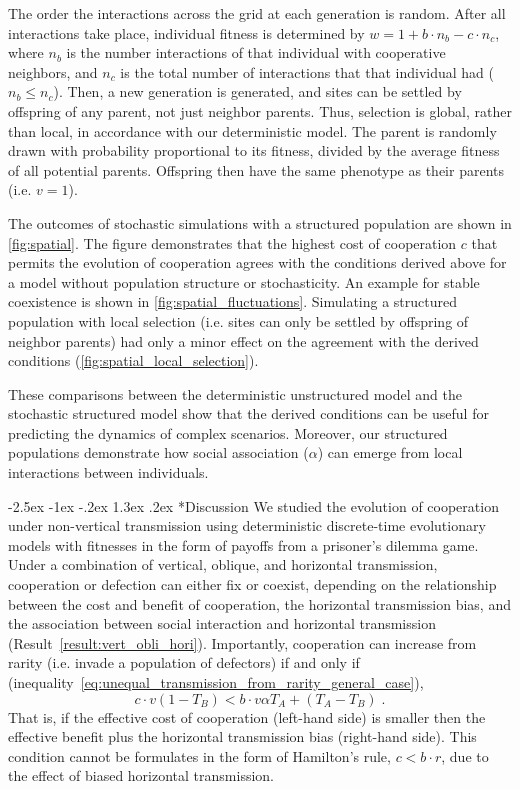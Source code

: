 \documentclass[12pt]{extarticle}
\makeatletter
\renewcommand\section{\@startsection {section}{1}{\z@}%
     {-2.5ex \@plus -1ex \@minus -.2ex}%
     {1.3ex \@plus.2ex}%
    {\Large\bfseries}}
\makeatother
\begin{document}
The order the interactions across the grid at each generation is random.
After all interactions take place, individual fitness is determined by
$w = 1 + b \cdot n_b - c \cdot n_c$,
where $n_b$ is the number interactions of that individual with cooperative neighbors, and $n_c$ is the total number of interactions that that individual  had ($n_b \le n_c$).
Then, a new generation is generated, and sites can be settled by offspring of any parent, not just neighbor parents. Thus, selection is global, rather than local, in accordance with our deterministic model.
The parent is randomly drawn with probability proportional to its fitness, divided by the average fitness of all potential parents.
Offspring then have the same phenotype as their parents (i.e. $v=1$).

The outcomes of stochastic simulations with a structured population are shown in \autoref{fig:spatial}. The figure demonstrates that the highest cost of cooperation $c$ that permits the evolution of cooperation agrees with the conditions derived above for a model without population structure or stochasticity.
An example for stable coexistence is shown in \autoref{fig:spatial_fluctuations}.
Simulating a structured population with local selection (i.e. sites can only be settled by offspring of neighbor parents) had only a minor effect on the agreement with the derived conditions (\autoref{fig:spatial_local_selection}).

These comparisons between the deterministic unstructured model and the stochastic structured model show that the derived conditions can be useful for predicting the dynamics of complex scenarios. 
Moreover, our structured populations demonstrate how social association ($\alpha$) can emerge from local interactions between individuals.


\section*{Discussion}
We studied the evolution of cooperation under non-vertical transmission using deterministic discrete-time evolutionary models with fitnesses in the form of payoffs from a prisoner's dilemma game. 
Under a combination of vertical, oblique, and horizontal transmission, cooperation or defection can either fix or coexist, depending on the relationship between the cost and benefit of cooperation, the horizontal transmission bias, and the association between social interaction and horizontal transmission (Result~\autoref{result:vert_obli_hori}).
Importantly, cooperation can increase from rarity (i.e. invade a population of defectors) if and only if (inequality~\ref{eq:unequal_transmission_from_rarity_general_case}),
\begin{equation}
c \cdot v (1-T_B) < b \cdot v \alpha T_A + (T_A - T_B) \;.
\end{equation}
That is, if the effective cost of cooperation (left-hand side) is smaller then the effective benefit plus the horizontal transmission bias (right-hand side).
This condition cannot be formulates in the form of Hamilton's rule, $c<b \cdot r$, due to the effect of biased horizontal transmission.
\end{document}
